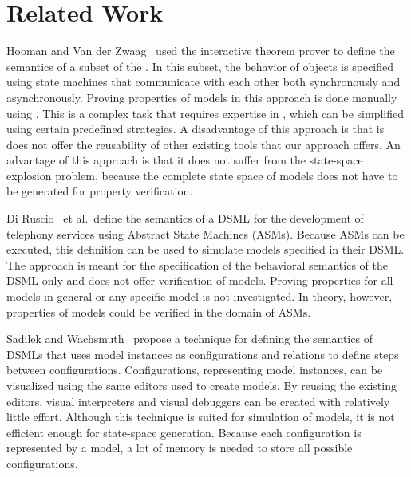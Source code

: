 \section{Related Work}
\label{sec:prototype-semantics:Related_Work}
Hooman and Van der Zwaag~\cite{Hooman2006} used the interactive theorem prover \PVS to define the semantics of a subset of the \UML.
In this subset, the behavior of objects is specified using state machines that communicate with each other both synchronously and asynchronously.
Proving properties of models in this approach is done manually using \PVS.
This is a complex task that requires expertise in \PVS, which can be simplified using certain predefined strategies.
A disadvantage of this approach is that is does not offer the reusability of other existing tools that our approach offers.
An advantage of this approach is that it does not suffer from the state-space explosion problem, because the complete state space of models does not have to be generated for property verification.

Di Ruscio~\cite{Ruscio06apractical} et al.\ define the semantics of a DSML for the development of telephony services using Abstract State Machines (ASMs).
Because ASMs can be executed, this definition can be used to simulate models specified in their DSML.
The approach is meant for the specification of the behavioral semantics of the DSML only and does not offer verification of models.
Proving properties for all models in general or any specific model is not investigated.
In theory, however, properties of models could be verified in the domain of ASMs.

Sadilek and Wachsmuth~\cite{Sadilek:2008:PVI:1426334.1426341} propose a technique for defining the semantics of DSMLs that uses model instances as configurations and \QVT relations to define steps between configurations.
Configurations, representing model instances, can be visualized using the same editors used to create models.
By reusing the existing editors, visual interpreters and visual debuggers can be created with relatively little effort.
Although this technique is suited for simulation of models, it is not efficient enough for state-space generation.
Because each configuration is represented by a model, a lot of memory is needed to store all possible configurations.

